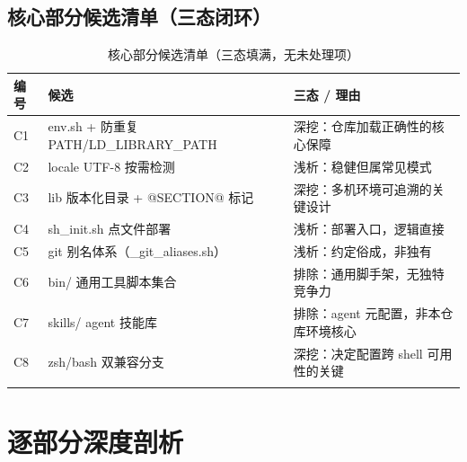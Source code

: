 \documentclass[UTF8]{ctexart}
\begin{document}
\subsection{核心部分候选清单（三态闭环）}
\begin{xltabular}{\textwidth}{llX}
\toprule
\textcolor{algo}{编号} & 候选 & 三态 / 理由 \\
\midrule
\endhead
C1 & env.sh + 防重复 PATH/LD\_LIBRARY\_PATH & \textcolor{algo}{深挖}：仓库加载正确性的核心保障 \\
C2 & locale UTF-8 按需检测 & 浅析：稳健但属常见模式 \\
C3 & lib 版本化目录 + @SECTION@ 标记 & \textcolor{algo}{深挖}：多机环境可追溯的关键设计 \\
C4 & sh\_init.sh 点文件部署 & 浅析：部署入口，逻辑直接 \\
C5 & git 别名体系（\_git\_aliases.sh） & 浅析：约定俗成，非独有 \\
C6 & bin/ 通用工具脚本集合 & 排除：通用脚手架，无独特竞争力 \\
C7 & skills/ agent 技能库 & 排除：agent 元配置，非本仓库环境核心 \\
C8 & zsh/bash 双兼容分支 & \textcolor{algo}{深挖}：决定配置跨 shell 可用性的关键 \\
\bottomrule
\caption{核心部分候选清单（三态填满，无未处理项）}
\end{xltabular}

\section{逐部分深度剖析}
\end{document}
